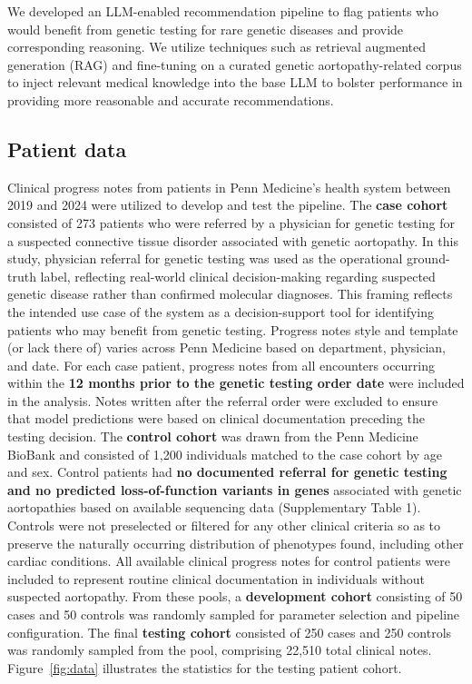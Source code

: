 \documentclass[fleqn,10pt]{wlscirep}
\begin{document}
We developed an LLM-enabled recommendation pipeline to flag patients who would benefit from genetic testing for rare genetic diseases and provide corresponding reasoning. We utilize techniques such as retrieval augmented generation (RAG) and fine-tuning on a curated genetic aortopathy-related corpus to inject relevant medical knowledge into the base LLM to bolster performance in providing more reasonable and accurate recommendations.

\subsection*{Patient data}

Clinical progress notes from patients in Penn Medicine’s health system between 2019 and 2024 were utilized to develop and test the pipeline. The \textbf{case cohort} consisted of 273 patients who were referred by a physician for genetic testing for a suspected connective tissue disorder associated with genetic aortopathy. In this study, physician referral for genetic testing was used as the operational ground-truth label, reflecting real-world clinical decision-making regarding suspected genetic disease rather than confirmed molecular diagnoses. This framing reflects the intended use case of the system as a decision-support tool for identifying patients who may benefit from genetic testing. Progress notes style and template (or lack there of) varies across Penn Medicine based on department, physician, and date. For each case patient, progress notes from all encounters occurring within the \textbf{12 months prior to the genetic testing order date} were included in the analysis. Notes written after the referral order were excluded to ensure that model predictions were based on clinical documentation preceding the testing decision.
The \textbf{control cohort} was drawn from the Penn Medicine BioBank\cite{verma2022penn} and consisted of 1,200 individuals matched to the case cohort by age and sex. Control patients had \textbf{no documented referral for genetic testing and no predicted loss-of-function variants in genes} associated with genetic aortopathies based on available sequencing data (Supplementary Table 1). Controls were not preselected or filtered for any other clinical criteria so as to preserve the naturally occurring distribution of phenotypes found, including other cardiac conditions. All available clinical progress notes for control patients were included to represent routine clinical documentation in individuals without suspected aortopathy. From these pools, a \textbf{development cohort} consisting of 50 cases and 50 controls was randomly sampled for parameter selection and pipeline configuration. The final \textbf{testing cohort} consisted of 250 cases and 250 controls was randomly sampled from the pool, comprising 22,510 total clinical notes. Figure~\ref{fig:data} illustrates the statistics for the testing patient cohort.
\end{document}
